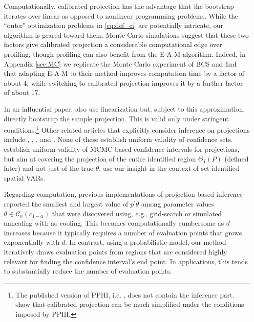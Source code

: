 \documentclass[letterpaper,11pt]{article}
\theoremstyle{myplain}
\theoremstyle{mydefinition}
\theoremstyle{myremark}
\renewcommand{\cite}{\citet}
\numberwithin{equation}{section}
\numberwithin{figure}{section}
\begin{document}
Computationally, calibrated projection has the advantage that the bootstrap iterates over linear as opposed to nonlinear programming problems. While the ``outer" optimization problems in \eqref{eq:def_ci} are potentially intricate, our algorithm is geared toward them. Monte Carlo simulations suggest that these two factors give calibrated projection a considerable computational edge over profiling, though profiling can also benefit from the E-A-M algorithm. Indeed, in Appendix \ref{sec:MC} we replicate the Monte Carlo experiment of BCS and find that adapting E-A-M to their method improves computation time by a factor of about $4$, while switching to calibrated projection improves it by a further factor of about $17$.

In an influential paper,
\cite[][PPHI henceforth]{PakesPorterHo2011} also use linearization but, subject to this approximation, directly bootstrap the sample projection. This is valid only under stringent conditions.\footnote{The published version of PPHI, i.e. \cite{PPHI_ECMA}, does not contain the inference part. \cite[Section 4.2]{KMS_2017} show that calibrated projection can be much simplified under the conditions imposed by PPHI.} Other related articles that explicitly consider inference on projections include 
\cite{ber:mol08}, \cite{BontempsMagnacMaurin2012E},
\cite{Kaido12},
and \cite{KT15}.
None of these establish uniform validity of confidence sets. \cite{CCOT} establish uniform validity of MCMC-based confidence intervals for projections, but aim at covering the projection of the entire identified region $\Theta_I(P)$ (defined later) and not just of the true $\theta$. \cite{GMO16} use our insight in the context of set identified spatial VARs.

Regarding computation, previous implementations of projection-based inference \citep[e.g.,][]{CilibertoTamer09,Grieco14,dic:mor16} reported the smallest and largest value of $p^\prime \theta$ among parameter values $\theta \in \mathcal C_n(c_{1-\alpha})$ that were discovered using, e.g., grid-search or simulated annealing with no cooling. This becomes computationally cumbersome as $d$ increases because it typically requires a number of evaluation points that grows exponentially with $d$. In contrast, using a probabilistic model, our method iteratively draws evaluation points from regions that are considered highly relevant for finding the confidence interval's end point. In applications, this tends to substantially reduce the number of evaluation points.
\end{document}
